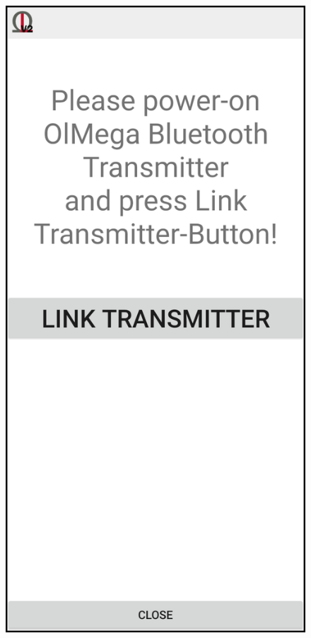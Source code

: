\documentclass[11pt,a4paper,titlepage]{article}
\begin{document}
\begin{figure}
\vspace{-0.5cm}
		\centering
			\begin{minipage}{0.30\textwidth}
			\includegraphics[width=1.00\textwidth]{images/linking.png}
			\label{fig:menu}
			\vspace{-2cm}
			\end{minipage}
	\end{figure}
\end{document}
